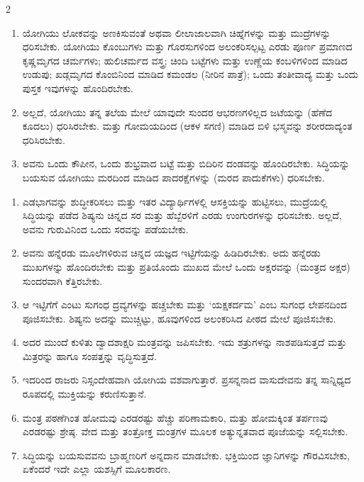 \begin{multicols}{2}
\begin{kan}
 
\begin{enumerate}[nosep]
\item[13–14.] ಯೋಗಿಯು ಲೋಕವನ್ನು ಅಣಕಿಸುವಂತೆ ಅಥವಾ ಲೀಲಾಜಾಲವಾಗಿ ಚಿಹ್ನೆಗಳನ್ನು ಮತ್ತು ಮುದ್ರೆಗಳನ್ನು ಧರಿಸಬೇಕು. ಯೋಗಿಯು ಕೊಂಬುಗಳು ಮತ್ತು ಗೊರಸುಗಳಿಂದ ಅಲಂಕರಿಸಲ್ಪಟ್ಟ ಎರಡು ಪೂರ್ಣ ಪ್ರಮಾಣದ ಕೃಷ್ಣಮೃಗದ ಚರ್ಮಗಳು; ಹುಲಿಚರ್ಮದ ವಸ್ತ್ರ; ಚಿಂದಿ ಬಟ್ಟೆಗಳು ಮತ್ತು ಉಣ್ಣೆಯ ಕಂಬಳಿಗಳಿಂದ ಮಾಡಿದ ಉಡುಪು; ಖಡ್ಗಮೃಗದ ಕೊಂಬಿನಿಂದ ಮಾಡಿದ ಕಮಂಡಲ (ನೀರಿನ ಪಾತ್ರೆ); ಒಂದು ತಂತೀವಾದ್ಯ ಮತ್ತು ಒಂದು ಪುಸ್ತಕ ಇವುಗಳನ್ನು ಹೊಂದಿರಬೇಕು.
\item[15.] ಅಲ್ಲದೆ, ಯೋಗಿಯು ತನ್ನ ತಲೆಯ ಮೇಲೆ ಯಾವುದೇ ಸುಂದರ ಆಭರಣಗಳಿಲ್ಲದ ಜಟೆಯನ್ನು (ಹೆಣೆದ ಕೂದಲು) ಧರಿಸಿರಬೇಕು. ಮತ್ತು ಗೋಮಯದಿಂದ (ಆಕಳ ಸಗಣಿ) ಮಾಡಿದ ಬಿಳಿ ಭಸ್ಮವನ್ನು ಶರೀರದಾದ್ಯಂತ ಧರಿಸಿರಬೇಕು.
\item[16.] ಅವನು ಒಂದು ಕೌಪೀನ, ಒಂದು ಶುಭ್ರವಾದ ಬಟ್ಟೆ ಮತ್ತು ಬಿದಿರಿನ ದಂಡವನ್ನು ಹೊಂದಿರಬೇಕು. ಸಿದ್ಧಿಯನ್ನು ಬಯಸುವ ಯೋಗಿಯು ಮರದಿಂದ ಮಾಡಿದ ಪಾದರಕ್ಷೆಗಳನ್ನು (ಮರದ ಪಾದುಕೆಗಳು) ಧರಿಸಬೇಕು.
\end{enumerate}


\begin{enumerate}[nosep]
\item[17.] ಎಡಭಾಗವನ್ನು ಶುದ್ಧೀಕರಿಸಲು ಮತ್ತು ಇತರ ವಿದ್ಯಾರ್ಥಿಗಳಲ್ಲಿ ಆಸಕ್ತಿಯನ್ನು ಹುಟ್ಟಿಸಲು, ಮುದ್ರೆಯಲ್ಲಿ ಸಿದ್ಧಿಯನ್ನು ಪಡೆದ ಶಿಷ್ಯನು ಚಿನ್ನದ ಸರ ಮತ್ತು ಹೆಬ್ಬೆರಳಿಗೆ ಎರಡು ಉಂಗುರಗಳನ್ನು ಧರಿಸಬೇಕು. ಅಲ್ಲದೆ, ಅವನು ಗುರುವಿನಿಂದ ಒಂದು ಸರವನ್ನು ಪಡೆಯಬೇಕು.
\item[18.] ಅವನು ಹನ್ನೆರಡು ಮೂಲೆಗಳಿರುವ ಚಿನ್ನದ ಯಜ್ಞದ ಇಟ್ಟಿಗೆಯನ್ನು ಹಿಡಿದಿರಬೇಕು. ಅದು ಹನ್ನೆರಡು ಮುಖಗಳನ್ನು ಹೊಂದಿರಬೇಕು ಮತ್ತು ಪ್ರತಿಯೊಂದು ಮುಖದ ಮೇಲೆ ಒಂದು ಅಕ್ಷರವನ್ನು (ಮಂತ್ರದ ಅಕ್ಷರ) ಸುಂದರವಾಗಿ ಕೆತ್ತಿರಬೇಕು.
\item[19.] ಆ ಇಟ್ಟಿಗೆಗೆ ಎಂಟು ಸುಗಂಧ ದ್ರವ್ಯಗಳನ್ನು ಹಚ್ಚಬೇಕು ಮತ್ತು ‘ಯಕ್ಷಕರ್ದಮ’ ಎಂಬ ಸುಗಂಧ ಲೇಪನದಿಂದ ಪೂಜಿಸಬೇಕು. ಶಿಷ್ಯನು ಅದನ್ನು ಮುಚ್ಚಿಟ್ಟು, ಹೂವುಗಳಿಂದ ಅಲಂಕರಿಸಿದ ಪೀಠದ ಮೇಲೆ ಪೂಜಿಸಬೇಕು.
\item[20.] ಅದರ ಮುಂದೆ ಕುಳಿತು ದ್ವಾದಶಾಕ್ಷರಿ ಮಂತ್ರವನ್ನು ಜಪಿಸಬೇಕು. ಇದು ಶತ್ರುಗಳನ್ನು ನಾಶಪಡಿಸುತ್ತದೆ ಮತ್ತು ಮಿತ್ರರನ್ನು ಹಾಗೂ ಸಂಪತ್ತನ್ನು ವೃದ್ಧಿಸುತ್ತದೆ.
\item[21.] ಇದರಿಂದ ರಾಜರು ನಿಸ್ಸಂದೇಹವಾಗಿ ಯೋಗಿಯ ವಶವಾಗುತ್ತಾರೆ. ಪ್ರಸನ್ನನಾದ ವಾಸುದೇವನು ತನ್ನ ಸಾನ್ನಿಧ್ಯದ ರೂಪದಲ್ಲಿ ಮುಕ್ತಿಯನ್ನು ಕರುಣಿಸುತ್ತಾನೆ.
\item[22.] ಮಂತ್ರ ಪಠಣೆಗಿಂತ ಹೋಮವು ಎರಡರಷ್ಟು ಹೆಚ್ಚು ಪರಿಣಾಮಕಾರಿ, ಮತ್ತು ಹೋಮಕ್ಕಿಂತ ತರ್ಪಣವು ಎರಡರಷ್ಟು ಶ್ರೇಷ್ಠ. ವೇದ ಮತ್ತು ತಂತ್ರೋಕ್ತ ಮಂತ್ರಗಳ ಮೂಲಕ ಅತ್ಯುನ್ನತವಾದ ಪೂಜೆಯನ್ನು ಸಲ್ಲಿಸಬೇಕು.
\item[23.] ಸಿದ್ಧಿಯನ್ನು ಬಯಸುವವನು ಬ್ರಾಹ್ಮಣರಿಗೆ ಅನ್ನದಾನ ಮಾಡಬೇಕು. ಭಕ್ತಿಯಿಂದ ಜ್ಞಾನಿಗಳನ್ನು ಗೌರವಿಸಬೇಕು, ಏಕೆಂದರೆ ಇದೇ ಎಲ್ಲಾ ಯಶಸ್ಸಿಗೆ ಮೂಲಕಾರಣ.
\end{enumerate}
\vskip 7pt


\end{kan}
\end{multicols}

